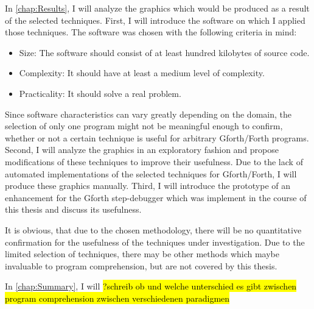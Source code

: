 In \autoref{chap:Results}, I will analyze the graphics which would be produced as a result of the selected techniques.
First, I will introduce the software on which I applied those techniques. The software was chosen with the following criteria in mind:
\begin{itemize}
\item Size: The software should consist of at least hundred kilobytes of source code.
\item Complexity: It should have at least a medium level of complexity.
\item Practicality: It should solve a real problem.
\end{itemize}
Since software characteristics can vary greatly depending on the domain, the selection of only one program might not be meaningful enough to confirm, whether or not a certain technique is useful for arbitrary Gforth/Forth programs.
Second, I will analyze the graphics in an exploratory fashion and propose modifications of these techniques to improve their usefulness. Due to the lack of automated implementations of the selected techniques for Gforth/Forth, I will produce these graphics manually.
Third, I will introduce the prototype of an enhancement for the Gforth step-debugger which was implement in the course of this thesis and discuss its usefulness.

It is obvious, that due to the chosen methodology, there will be no quantitative confirmation for the usefulness of the techniques under investigation. Due to the limited selection of techniques, there may be other methods which maybe invaluable to program comprehension, but are not covered by this thesis.

In \autoref{chap:Summary}, I will \hl{?schreib ob und welche unterschied es gibt zwischen program comprehension zwischen verschiedenen paradigmen}